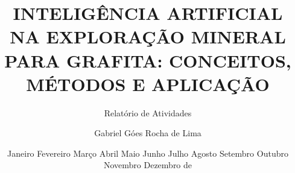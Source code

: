 

\title{\textbf{INTELIGÊNCIA ARTIFICIAL NA EXPLORAÇÃO MINERAL PARA GRAFITA: CONCEITOS, MÉTODOS E APLICAÇÃO}}

\subtitle{Relatório de Atividades}

\author{\large{Gabriel Góes Rocha de Lima}}

\date{\ifcase\month\or Janeiro \or Fevereiro \or Março \or Abril \or Maio \or Junho \or Julho \or Agosto \or Setembro \or Outubro \or Novembro \or Dezembro \fi de \number\year}
